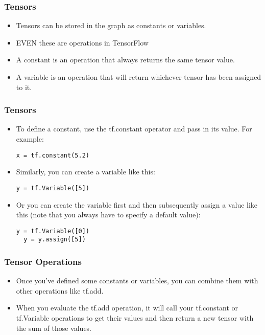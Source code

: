 \begin{frame}[fragile] \frametitle{Tensors}
\begin{itemize}
\item Tensors can be stored in the graph as constants or variables. 
\item EVEN these are operations in TensorFlow
\item A constant is an operation that always returns the same tensor value. 
\item A variable is an operation that will return whichever tensor has been assigned to it.
\end{itemize}
\end{frame}

\begin{frame}[fragile] \frametitle{Tensors}
\begin{itemize}
\item To define a constant, use the tf.constant operator and pass in its value. For example:
\begin{lstlisting}
x = tf.constant(5.2)
\end{lstlisting}
\item Similarly, you can create a variable like this:
\begin{lstlisting}
y = tf.Variable([5])
\end{lstlisting}
\item Or you can create the variable first and then subsequently assign a value like this (note that you always have to specify a default value):
\begin{lstlisting}
y = tf.Variable([0])
  y = y.assign([5])
\end{lstlisting}
\end{itemize}
\end{frame}

\begin{frame}[fragile] \frametitle{Tensor Operations}
\begin{itemize}
\item Once you've defined some constants or variables, you can combine them with other operations like tf.add. 
\item When you evaluate the tf.add operation, it will call your tf.constant or tf.Variable operations to get their values and then return a new tensor with the sum of those values.
\end{itemize}
\end{frame}

